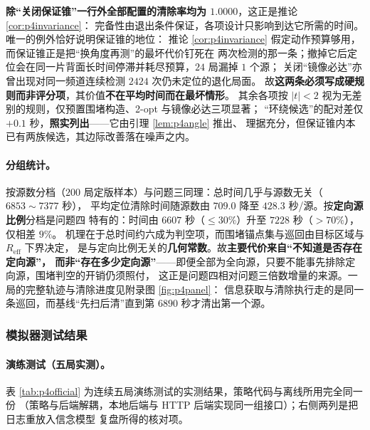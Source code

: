 \documentclass[withoutpreface, bwprint]{cumcmthesis}
\begin{document}
\textbf{除“关闭保证锥”一行外全部配置的清除率均为 $1.0000$}，这正是推论 \ref{cor:p4invariance}：
完备性由退出条件保证，各项设计只影响到达它所需的时间。唯一的例外恰好说明保证锥的地位：
推论 \ref{cor:p4invariance} 假定动作预算够用，而保证锥正是把“换角度再测”的最坏代价钉死在
两次检测的那一条；撤掉它后定位会在同一片背面长时间停滞并耗尽预算，$24$ 局漏掉 $1$ 个源；
关闭“镜像必达”亦曾出现对同一频道连续检测 $2424$ 次仍未定位的退化局面。
故\textbf{这两条必须写成硬规则而非评分项}，其价值\textbf{不在平均时间而在最坏情形}。
其余各项按 $\lvert t\rvert<2$ 视为无差别的规则，仅预置围堵构造、2-opt 与镜像必达三项显著；
“环绕候选”的配对差仅 $+0.1$ 秒，\textbf{照实列出}——它由引理 \ref{lem:p4angle} 推出、
理据充分，但保证锥内本已有两族候选，其边际改善落在噪声之内。

\paragraph{分组统计。}
按源数分档（$200$ 局定版样本）与问题三同理：总时间几乎与源数无关（$6853\sim7377$ 秒），
平均定位清除时间随源数由 $709.0$ 降至 $428.3$ 秒/源。按\textbf{定向源比例}分档是问题四
特有的：时间由 $6607$ 秒（$\le 30\%$）升至 $7228$ 秒（$>70\%$），仅相差 $9\%$。
机理在于总时间约六成为判空项，而围堵锚点集与巡回由目标区域与 $R_{\mathrm{eff}}$ 下界决定，
是与定向比例无关的\textbf{几何常数}。故\textbf{主要代价来自“不知道是否存在定向源”，
而非“存在多少定向源”}——即便全部为全向源，只要不能事先排除定向源，围堵判空的开销仍须照付，
这正是问题四相对问题三倍数增量的来源。一局的完整轨迹与清除进度见附录图 \ref{fig:p4panel}：
信息获取与清除执行走的是同一条巡回，而基线“先扫后清”直到第 $6890$ 秒才清出第一个源。

\subsubsection{模拟器测试结果}

\paragraph{演练测试（五局实测）。}
表 \ref{tab:p4official} 为连续五局演练测试的实测结果，策略代码与离线所用完全同一份
（策略与后端解耦，本地后端与 HTTP 后端实现同一组接口）；右侧两列是把日志重放入信念模型
复盘所得的核对项。
\end{document}
